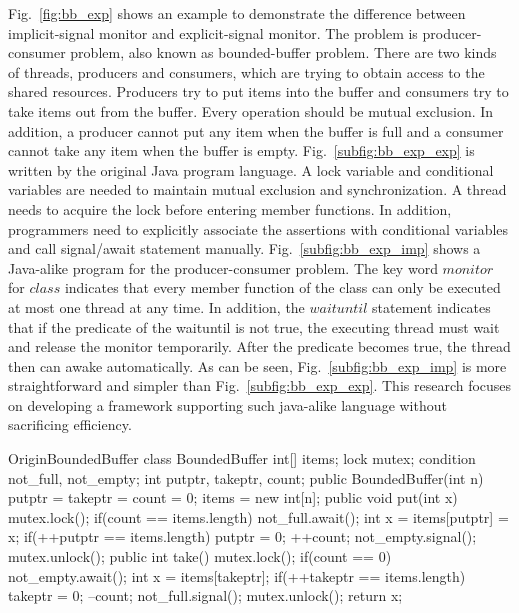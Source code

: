 \documentclass[10pt, conference, compsocconf]{IEEEtran}
\begin{document}
Fig.~\ref{fig:bb_exp} shows an example to
demonstrate the difference between implicit-signal monitor and explicit-signal 
monitor. The problem is producer-consumer problem, also known as bounded-buffer
problem. There are two kinds of threads, producers and consumers, which are 
trying to obtain access to the shared resources. Producers try to put items 
into the buffer and consumers try to take items out from the buffer. Every 
operation should be mutual exclusion. In addition, a producer cannot put any 
item when the buffer is full and a consumer cannot take any item when the 
buffer is empty. Fig.~\ref{subfig:bb_exp_exp} is written by the original Java
program language. A lock variable and conditional variables are
needed to maintain mutual exclusion and synchronization. A thread needs to
acquire the lock before entering member functions. In addition, programmers need
to explicitly associate the assertions with conditional variables and call
signal/await statement manually. Fig.~\ref{subfig:bb_exp_imp} shows a Java-alike
program for the producer-consumer problem. The key word $monitor$ for $class$
indicates that every member function of the class can only be executed at most
one thread at any time. In addition, the $waituntil$ statement indicates that if
the predicate of the waituntil is not true, the executing thread must wait and
release the monitor temporarily. After the predicate becomes true, the thread
then can awake automatically. As can be seen, Fig.~\ref{subfig:bb_exp_imp} is
more straightforward and simpler than Fig.~\ref{subfig:bb_exp_exp}. This research
focuses on developing a framework supporting such java-alike language without 
sacrificing efficiency.


\begin{SaveVerbatim}{OriginBoundedBuffer}
class BoundedBuffer {
  int[] items;  
  lock mutex;
  condition not_full, not_empty;
  int putptr, takeptr, count;
  public BoundedBuffer(int n) {
    putptr = takeptr = count = 0;
    items = new int[n];
  } 
  public void put(int x) {
    mutex.lock();
    if(count == items.length) {
      not_full.await();
    }
    int x = items[putptr] = x;
    if(++putptr == items.length) {
      putptr = 0;
    }
    ++count;
    not_empty.signal();
    mutex.unlock();
  }
  public int take() {
    mutex.lock();
    if(count == 0) {
      not_empty.await();
    }
    int x = items[takeptr];
    if(++takeptr == items.length) {
      takeptr = 0;
    }
    --count;
    not_full.signal();
    mutex.unlock();
    return x;
  }
}
\end{SaveVerbatim}
\end{document}
